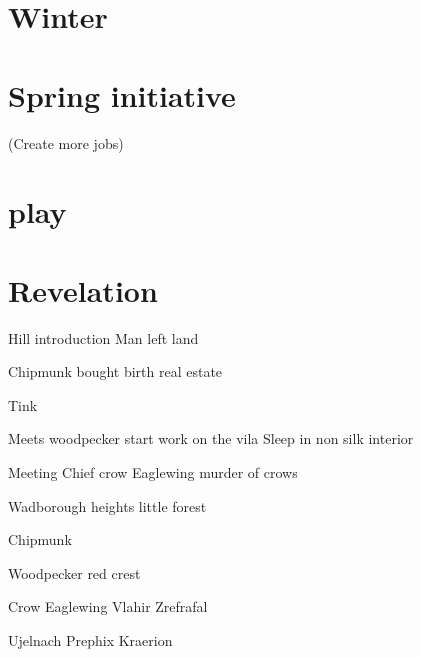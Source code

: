 \documentclass[smalldemyvopaper,11pt,twoside,onecolumn,openright,extrafontsizes]{memoir}
\begin{document}
\chapter{Winter}

\chapter{Spring initiative}

(Create more jobs)

\chapter{play}

\chapter{Revelation}


 Hill introduction Man left land

 Chipmunk bought birth real estate
 
 Tink

 Meets woodpecker start work on the vila
 Sleep in non silk interior

Meeting Chief crow Eaglewing murder of crows

Wadborough heights little forest 

Chipmunk 

Woodpecker 
red crest

Crow Eaglewing
Vlahir
Zrefrafal

Ujelnach
Prephix
Kraerion


\end{document}
